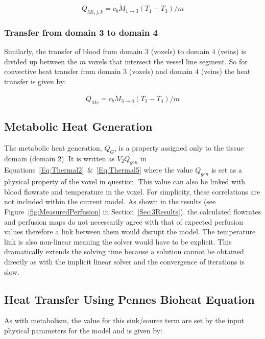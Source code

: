 \documentclass[11pt,english,a4paper,twoside,openright]{report}
\begin{document}
{{{{{{{{\begin{equation}
Q_{Mi,j,k}=c_{b}\dot{M}_{1\rightarrow3}(T_{1}-T_{3})/m
\end{equation}

\subsubsection{Transfer from domain 3 to domain 4}

Similarly, the transfer of blood from domain 3 (voxels) to domain 4 (veins) is divided up between the $m$ voxels that intersect the vessel line segment. So for convective heat transfer from domain 3 (voxels) and domain 4 (veins) the heat transfer is given by:

\begin{equation}
Q_{Mv}=c_{b}\dot{M}_{3\rightarrow4}(T_{3}-T_{4})/m
\end{equation}

\subsection{Metabolic Heat Generation}

The metabolic heat generation, $Q_{G}$, is a property assigned only to the tissue domain (domain 2). It is written as $V_{2}Q_{gen}$ in Equations~\ref{Eq:Thermal2}~\&~\ref{Eq:Thermal5} where the value $Q_{gen}$ is set as a physical property of the voxel in question. This value can also be linked with blood flowrate \cite{sukstanskii2006theoretical} and temperature \cite{konstas2007theoretical}\cite{michenfelder1991relationship} in the voxel. For simplicity, these correlations are not included within the current model. As shown in the results (see Figure~\ref{fig:MeasuredPerfusion} in Section~\ref{Sec:3Results}), the calculated flowrates and perfusion maps do not necessarily agree with that of expected perfusion values therefore a link between them would disrupt the model. The temperature link is also non-linear meaning the solver would have to be explicit. This dramatically extends the solving time because a solution cannot be obtained directly as with the implicit linear solver and the convergence of iterations is slow. 

\subsection{Heat Transfer Using Pennes Bioheat Equation}

As with metabolism, the value for this sink/source term are set by the input physical parameters for the model and is given by:

}}}}}}}}
\end{document}
